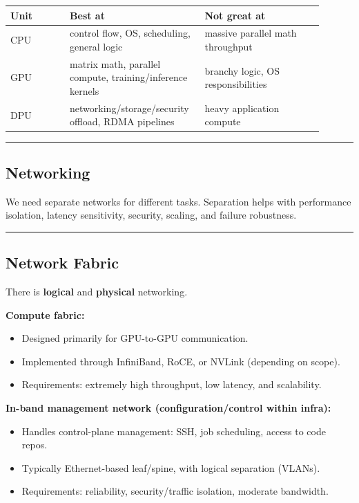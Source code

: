 \documentclass[11pt]{article}
\newcommand{\blue}[1]{\textcolor{myblue}{#1}}
\newcommand{\notespace}{
\vspace{0.8cm}
\hrule
\vspace{0.8cm}
}
\begin{document}
\begin{center}
\renewcommand{\arraystretch}{1.15}
\begin{tabular}{|p{0.18\linewidth}|p{0.36\linewidth}|p{0.36\linewidth}|}
\hline
\textbf{Unit} & \textbf{Best at} & \textbf{Not great at} \\
\hline
CPU & control flow, OS, scheduling, general logic & massive parallel math throughput \\
\hline
GPU & matrix math, parallel compute, training/inference kernels & branchy logic, OS responsibilities \\
\hline
DPU & networking/storage/security offload, RDMA pipelines & heavy application compute \\
\hline
\end{tabular}
\end{center}
\notespace

\subsection{Networking}
We need separate networks for different tasks. Separation helps with \blue{performance isolation}, \blue{latency sensitivity}, \blue{security}, \blue{scaling}, and \blue{failure robustness}.
\notespace

\subsection{Network Fabric}
There is \textbf{logical} and \textbf{physical} networking.

\textbf{Compute fabric:}
\begin{itemize}
\item Designed primarily for GPU-to-GPU communication.
\item Implemented through InfiniBand, RoCE, or NVLink (depending on scope).
\item Requirements: extremely high throughput, low latency, and scalability.
\end{itemize}

\textbf{In-band management network (configuration/control within infra):}
\begin{itemize}
\item Handles control-plane management: SSH, job scheduling, access to code repos.
\item Typically Ethernet-based leaf/spine, with logical separation (VLANs).
\item Requirements: reliability, security/traffic isolation, moderate bandwidth.
\end{itemize}
\end{document}
